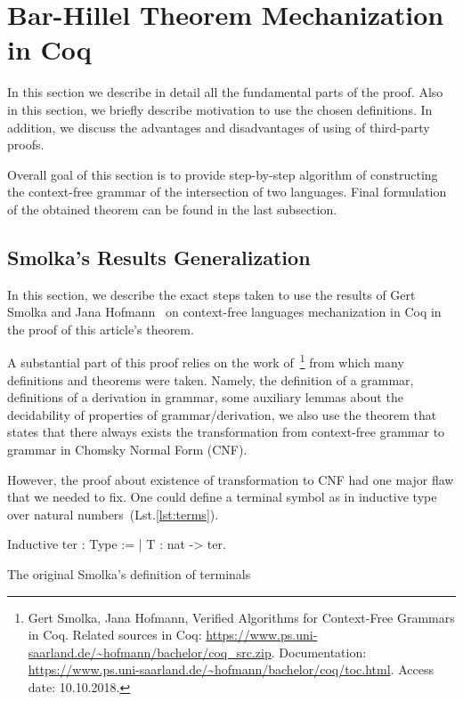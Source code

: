 \section{Bar-Hillel Theorem Mechanization in Coq}
\label{sec:main}

In this section we describe in detail all the fundamental parts of the proof. 
Also in this section, we briefly describe motivation to use the chosen definitions. 
In addition, we discuss the advantages and disadvantages of using of third-party proofs. 

Overall goal of this section is to provide step-by-step algorithm of constructing the context-free grammar of the intersection of two languages.
Final formulation of the obtained theorem can be found in the last subsection. 
   
\subsection{ Smolka's Results Generalization}
\label{sec:solka-generalized}

In this section, we describe the exact steps taken to use the results of Gert Smolka and Jana Hofmann~\cite{smolkaHofmann2016} on context-free languages mechanization in Coq in the proof of this article's theorem.

A substantial part of this proof relies on the work of~\cite{smolkaHofmann2016}\footnote{Gert Smolka, Jana Hofmann, Verified Algorithms for Context-Free Grammars in Coq. Related sources in Coq: \url{https://www.ps.uni-saarland.de/~hofmann/bachelor/coq_src.zip}. Documentation: \url{https://www.ps.uni-saarland.de/~hofmann/bachelor/coq/toc.html}. Access date: 10.10.2018.} from which many definitions and theorems were taken. Namely, the definition of a grammar, definitions of a derivation in grammar, some auxiliary lemmas about the decidability of properties of grammar/derivation, we also use the theorem that states that there always exists the transformation from context-free grammar to grammar in Chomsky Normal Form (CNF).

However, the proof about existence of transformation to CNF had one major flaw that we needed to fix. One could define a terminal symbol as in inductive type over natural numbers~(Lst.\ref{lst:terms}).

\begin{listing}[h]
	\begin{pyglist}[language=coq, numbers=none, numbersep=5pt]
  Inductive ter : Type := | T : nat -> ter.
	\end{pyglist}
	\caption{The original Smolka's definition of terminals}
	\label{lst:terms}
\end{listing}

